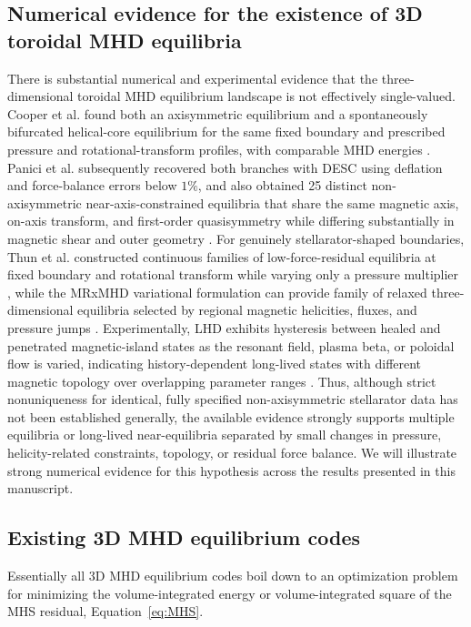\documentclass[%
 reprint,
 superscriptaddress,
 amsmath,amssymb,
 aps, nofootinbib, floatfix]{revtex4-2}
\begin{document}
\subsection{Numerical evidence for the existence of 3D toroidal MHD equilibria}
\label{subsec:numerical_evidence_3d}
There is substantial numerical and experimental evidence that the three-dimensional toroidal MHD equilibrium landscape is not effectively single-valued. Cooper et al. found both an axisymmetric equilibrium and a spontaneously bifurcated helical-core equilibrium for the same fixed boundary and prescribed pressure and rotational-transform profiles, with comparable MHD energies \cite{Cooper2010HelicalCore}. Panici et al. subsequently recovered both branches with DESC using deflation and force-balance errors below \(1\%\), and also obtained 25 distinct non-axisymmetric near-axis-constrained equilibria that share the same magnetic axis, on-axis transform, and first-order quasisymmetry while differing substantially in magnetic shear and outer geometry \cite{Panici2026Deflation}. For genuinely stellarator-shaped boundaries, Thun et al. constructed continuous families of low-force-residual equilibria at fixed boundary and rotational transform while varying only a pressure multiplier \cite{Thun2026Narrow}, while the MRxMHD variational formulation can provide family of relaxed three-dimensional equilibria selected by regional magnetic helicities, fluxes, and pressure jumps \cite{Hudson2012MRxMHD}. Experimentally, LHD exhibits hysteresis between healed and penetrated magnetic-island states as the resonant field, plasma beta, or poloidal flow is varied, indicating history-dependent long-lived states with different magnetic topology over overlapping parameter ranges \cite{Narushima2015Hysteresis}. Thus, although strict nonuniqueness for identical, fully specified non-axisymmetric stellarator data has not been established generally, the available evidence strongly supports multiple equilibria or long-lived near-equilibria separated by small changes in pressure, helicity-related constraints, topology, or residual force balance. We will illustrate strong numerical evidence for this hypothesis across the results presented in this manuscript.


\subsection{Existing 3D MHD equilibrium codes}
\label{subsec:existing_codes}
Essentially all 3D MHD equilibrium codes boil down to an optimization problem for minimizing the volume-integrated energy or volume-integrated square of the MHS residual, Equation~\eqref{eq:MHS}.
\end{document}
